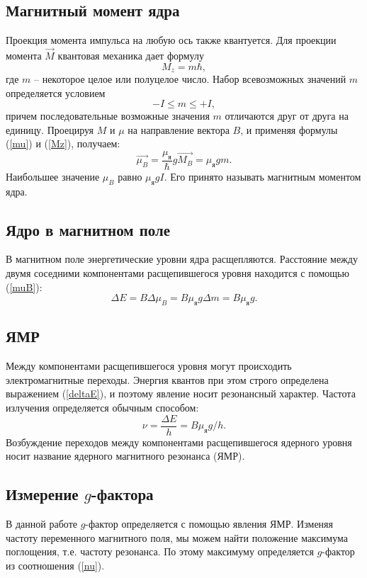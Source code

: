 \documentclass[12pt,a4paper]{article}
\begin{document}
\subsection{Магнитный момент ядра}
Проекция момента импульса на любую ось также квантуется. Для проекции момента $\vec{M}$ квантовая механика дает формулу
\begin{equation} \label{Mz}
M_z = m \hbar, 
\end{equation}
где $m$ -- некоторое целое или полуцелое число. Набор всевозможных значений $m$ определяется условием 
\begin{equation}
-I \leq m \leq +I,
\end{equation}
причем последовательные возможные значения $m$ отличаются друг от друга на единицу. Проецируя $M$ и $\mu$ на направление вектора $B$, и применяя формулы (\ref{mu}) и (\ref{Mz}), получаем:
\begin{equation} \label{muB}
\vec{\mu_B} = \frac{\mu_\text{я}}{\hbar} g \vec{M_B} = \mu_\text{я} g m.
\end{equation}
Наибольшее значение $\mu_B$ равно $\mu_\text{я} g I$. Его принято называть магнитным моментом ядра. 

\subsection{Ядро в магнитном поле}
В магнитном поле энергетические уровни ядра расщепляются. Расстояние между двумя соседними компонентами расщепившегося уровня находится с помощью (\ref{muB}):
\begin{equation} \label{deltaE}
\Delta E = B \Delta \mu_B = B \mu_\text{я} g \Delta m = B \mu_\text{я} g.
\end{equation}
\subsection{ЯМР}
Между компонентами расщепившегося уровня могут происходить электромагнитные переходы. Энергия квантов при этом строго определена выражением (\ref{deltaE}), и поэтому явление носит резонансный характер. Частота излучения определяется обычным способом:
\begin{equation} \label{nu}
\nu = \frac{\Delta E}{h} = B \mu_\text{я} g / h.
\end{equation}
Возбуждение переходов между компонентами расщепившегося ядерного уровня носит название ядерного магнитного резонанса (ЯМР). 
\subsection{Измерение $g$-фактора}
В данной работе $g$-фактор определяется с помощью явления ЯМР. Изменяя частоту переменного магнитного поля, мы можем найти положение максимума поглощения, т.е. частоту резонанса. По этому максимуму определяется $g$-фактор из соотношения (\ref{nu}).
\end{document}

